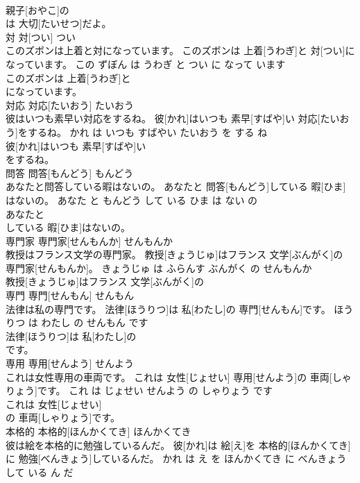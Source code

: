 \documentclass[8pt]{extreport}
\begin{document}
\begin{CJK}{UTF8}{min}
\\	親子[おやこ]の
\\	は 大切[たいせつ]だよ。			
\\	対	対[つい]	つい	
\\	このズボンは上着と対になっています。	このズボンは 上着[うわぎ]と 対[つい]になっています。	この ずぼん は うわぎ と つい に なって います	
\\	このズボンは 上着[うわぎ]と
\\	になっています。			
\\	対応	対応[たいおう]	たいおう	
\\	彼はいつも素早い対応をするね。	彼[かれ]はいつも 素早[すばや]い 対応[たいおう]をするね。	かれ は いつも すばやい たいおう を する ね	
\\	彼[かれ]はいつも 素早[すばや]い
\\	をするね。			
\\	問答	問答[もんどう]	もんどう	
\\	あなたと問答している暇はないの。	あなたと 問答[もんどう]している 暇[ひま]はないの。	あなた と もんどう して いる ひま は ない の	
\\	あなたと
\\	している 暇[ひま]はないの。			
\\	専門家	専門家[せんもんか]	せんもんか	
\\	教授はフランス文学の専門家。	教授[きょうじゅ]はフランス 文学[ぶんがく]の 専門家[せんもんか]。	きょうじゅ は ふらんす ぶんがく の せんもんか	
\\	教授[きょうじゅ]はフランス 文学[ぶんがく]の
\\	専門	専門[せんもん]	せんもん	
\\	法律は私の専門です。	法律[ほうりつ]は 私[わたし]の 専門[せんもん]です。	ほうりつ は わたし の せんもん です	
\\	法律[ほうりつ]は 私[わたし]の
\\	です。			
\\	専用	専用[せんよう]	せんよう	
\\	これは女性専用の車両です。	これは 女性[じょせい] 専用[せんよう]の 車両[しゃりょう]です。	これ は じょせい せんよう の しゃりょう です	
\\	これは 女性[じょせい]
\\	の 車両[しゃりょう]です。			
\\	本格的	本格的[ほんかくてき]	ほんかくてき	
\\	彼は絵を本格的に勉強しているんだ。	彼[かれ]は 絵[え]を 本格的[ほんかくてき]に 勉強[べんきょう]しているんだ。	かれ は え を ほんかくてき に べんきょう して いる ん だ	

\end{CJK}
\end{document}
